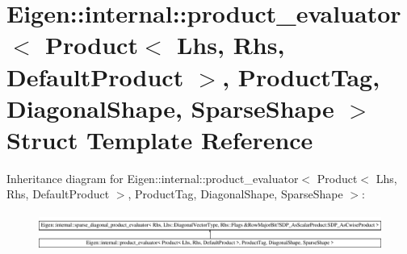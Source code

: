 \hypertarget{struct_eigen_1_1internal_1_1product__evaluator_3_01_product_3_01_lhs_00_01_rhs_00_01_default_pro850b56c5eb8e297547f40d125e705127}{}\section{Eigen\+::internal\+::product\+\_\+evaluator$<$ Product$<$ Lhs, Rhs, Default\+Product $>$, Product\+Tag, Diagonal\+Shape, Sparse\+Shape $>$ Struct Template Reference}
\label{struct_eigen_1_1internal_1_1product__evaluator_3_01_product_3_01_lhs_00_01_rhs_00_01_default_pro850b56c5eb8e297547f40d125e705127}
Inheritance diagram for Eigen\+::internal\+::product\+\_\+evaluator$<$ Product$<$ Lhs, Rhs, Default\+Product $>$, Product\+Tag, Diagonal\+Shape, Sparse\+Shape $>$\+:\begin{figure}[H]
\begin{center}
\leavevmode
\includegraphics[height=1.217391cm]{struct_eigen_1_1internal_1_1product__evaluator_3_01_product_3_01_lhs_00_01_rhs_00_01_default_pro850b56c5eb8e297547f40d125e705127}
\end{center}
\end{figure}

